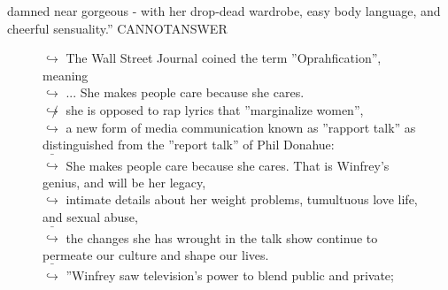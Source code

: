 \documentclass[11pt,a4paper, onecolumn]{article}
\begin{document}
damned near gorgeous - with her drop-dead wardrobe, easy body language, and cheerful sensuality.'' CANNOTANSWER

\begin{figure}[t] \small \begin{tcolorbox}[boxsep=0pt,left=5pt,right=0pt,top=2pt,colback = yellow!5] \begin{dialogue}
 \small 
\colorbox{pink!25}{$\hookrightarrow$}
{ The Wall Street Journal coined the term ''Oprahfication'', meaning }
\\
\colorbox{pink!25}{$\hookrightarrow$}
{ ... She makes people care because she cares. }
\\
\colorbox{pink!25}{$\not\hookrightarrow$}
{ she is opposed to rap lyrics that ''marginalize women'', }
\\
\colorbox{pink!25}{$\hookrightarrow$}
{ a new form of media communication known as ''rapport talk'' as distinguished from the ''report talk'' of Phil Donahue: }
\\
\colorbox{pink!25}{ $\bar{\hookrightarrow}$}
{ She makes people care because she cares. That is Winfrey's genius, and will be her legacy, }
\\
\colorbox{pink!25}{$\hookrightarrow$}
{ intimate details about her weight problems, tumultuous love life, and sexual abuse, }
\\
\colorbox{pink!25}{ $\bar{\hookrightarrow}$}
{ the changes she has wrought in the talk show continue to permeate our culture and shape our lives. }
\\
\colorbox{pink!25}{ $\bar{\hookrightarrow}$}
{ ''Winfrey saw television's power to blend public and private; }
 \end{dialogue}\end{tcolorbox}\end{figure}
\end{document}
